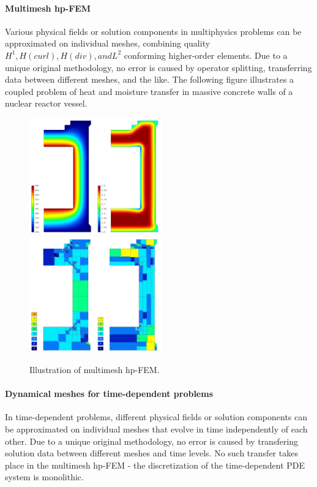 \paragraph{Multimesh hp-FEM}
Various physical fields or solution components in multiphysics problems can be approximated on individual meshes, combining quality $H^1, H(curl), H(div), and L^2$ conforming higher-order elements. Due to a unique original methodology, no error is caused by operator splitting, transferring data between different meshes, and the like. The following figure illustrates a coupled problem of heat and moisture transfer in massive concrete walls of a nuclear reactor vessel.

\begin{figure}[!ht]
\centering
\includegraphics[height=5cm]{img/hermes_hm_sol.png}
\hspace{10mm}
\includegraphics[height=5cm]{img/hermes_hm_mesh.png}
\caption{Illustration of multimesh hp-FEM.}
\label{fig:hermes_hm}
\end{figure}
\noindent

\paragraph{Dynamical meshes for time-dependent problems}
In time-dependent problems, different physical fields or solution components can be approximated on individual meshes that evolve in time independently of each other. Due to a unique original methodology, no error is caused by transfering solution data between different meshes and time levels. No such transfer takes place in the multimesh hp-FEM - the discretization of the time-dependent PDE system is monolithic.
